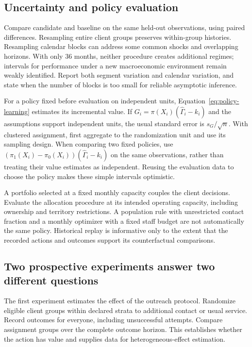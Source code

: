 \subsection{Uncertainty and policy evaluation}

Compare candidate and baseline on the same held-out observations, using paired differences. Resampling entire client groups preserves within-group histories. Resampling calendar blocks can address some common shocks and overlapping horizons. With only 36 months, neither procedure creates additional regimes; intervals for performance under a new macroeconomic environment remain weakly identified. Report both segment variation and calendar variation, and state when the number of blocks is too small for reliable asymptotic inference.

For a policy fixed before evaluation on independent units, Equation~\eqref{eq:policy-learning} estimates its incremental value. If $G_i=\pi(X_i)(\widehat\Gamma_i-k_i)$ and the assumptions support independent units, the usual standard error is $s_G/\sqrt n$. With clustered assignment, first aggregate to the randomization unit and use its sampling design. When comparing two fixed policies, use $(\pi_1(X_i)-\pi_0(X_i))(\widehat\Gamma_i-k_i)$ on the same observations, rather than treating their value estimates as independent. Reusing the evaluation data to choose the policy makes these simple intervals optimistic.

A portfolio selected at a fixed monthly capacity couples the client decisions. Evaluate the allocation procedure at its intended operating capacity, including ownership and territory restrictions. A population rule with unrestricted contact fraction and a monthly optimizer with a fixed staff budget are not automatically the same policy. Historical replay is informative only to the extent that the recorded actions and outcomes support its counterfactual comparisons.

\subsection{Two prospective experiments answer two different questions}

The first experiment estimates the effect of the outreach protocol. Randomize eligible client groups within declared strata to additional contact or usual service. Record outcomes for everyone, including unsuccessful attempts. Compare assignment groups over the complete outcome horizon. This establishes whether the action has value and supplies data for heterogeneous-effect estimation.

